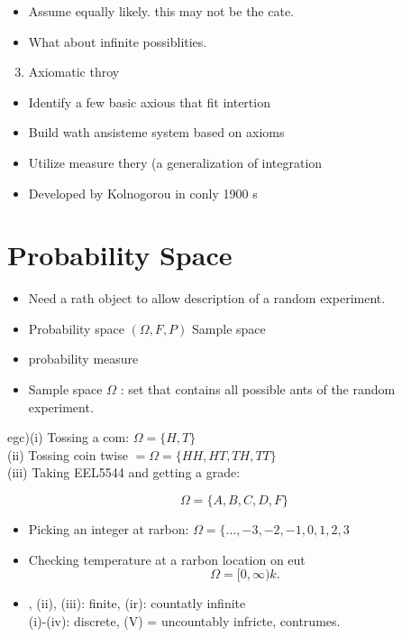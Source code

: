 \documentclass[10pt]{article}
\begin{document}
\begin{itemize}
  \item[-] Assume equally likely. this may not be the cate.
  \item[-] What about infinite possiblities.
\end{itemize}

\begin{enumerate}
  \setcounter{enumi}{2}
  \item Axiomatic throy
\end{enumerate}

\begin{itemize}
  \item[-] Identify a few basic axious that fit intertion
  \item[-] Build wath ansisteme system based on axioms
  \item[-] Utilize measure thery (a generalization of integration
  \item[-] Developed by Kolnogorou in conly 1900 s
\end{itemize}

\section*{Probability Space}
\begin{itemize}
  \item[-] Need a rath object to allow description of a random experiment.
  \item[-] Probability space \((\Omega, F, P)\) Sample space
  \item[] probability measure
  \item[-] Sample space \(\Omega\) : set that contains all possible ants of the random experiment.
\end{itemize}

egc)(i) Tossing a com: \(\Omega=\{H, T\}\)\\
(ii) Tossing coin twise \(=\Omega=\{H H, H T, T H, T T\}\)\\
(iii) Taking EEL5544 and getting a grade:

\[
\Omega=\{A, B, C, D, F\}
\]

\begin{itemize}
  \item[(iv)] Picking an integer at rarbon: \(\Omega=\{\ldots,-3,-2,-1,0,1,2,3\)
  \item[(v)] Checking temperature at a rarbon location on eut
\[
\Omega=[0, \infty) k .
\]
  \item[(i)] , (ii), (iii): finite, (ir): countatly infinite\\
(i)-(iv): discrete, (V) = uncountably infricte, contrumes.
\end{itemize}
\end{document}
